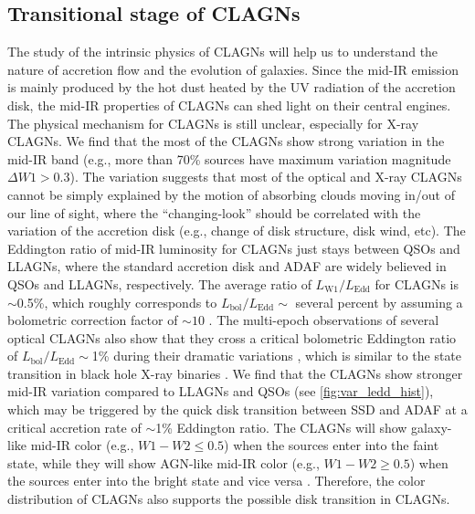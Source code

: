 \documentclass[linenumbers]{aastex631}
\begin{document}
\subsection{Transitional stage of CLAGNs}
The study of the intrinsic physics of CLAGNs will help us to understand the nature of accretion flow and the evolution of galaxies. Since the mid-IR emission is mainly produced by the hot dust heated by the UV radiation of the accretion disk, the mid-IR properties of CLAGNs can shed light on their central engines. The physical mechanism for CLAGNs is still unclear, especially for X-ray CLAGNs. We find that the most of the CLAGNs show strong variation in the mid-IR band (e.g., more than 70\% sources have maximum variation magnitude $\Delta W1>0.3$). The variation suggests that most of the optical and X-ray CLAGNs cannot be simply explained by the motion of absorbing clouds moving in/out of our line of sight, where the ``changing-look'' should be correlated with the variation of the accretion disk (e.g., change of disk structure, disk wind, etc). The Eddington ratio of mid-IR luminosity for CLAGNs just stays between QSOs and LLAGNs, where the standard accretion disk and ADAF are widely believed in QSOs and LLAGNs, respectively. The average ratio of $L_\mathrm{W1}/L_\mathrm{Edd}$ for CLAGNs is $\sim $0.5\%, which roughly corresponds to $L_\mathrm{bol}/L_\mathrm{Edd}\sim$ several percent by assuming a bolometric correction factor of $\sim 10$ \citep[e.g.,][]{2012MNRAS.426.2677R}. The multi-epoch observations of several {\color{red}optical} CLAGNs also show that they cross a critical bolometric Eddington ratio of $L_\mathrm{bol}/L_\mathrm{Edd}\sim$1\% during their dramatic variations \citep[e.g.,][]{2019ApJ...874....8M,2019ApJ...883...76R,2021MNRAS.508..144G,2021MNRAS.506.4188L,2021MNRAS.507..687J}, which is similar to the state transition in black hole X-ray binaries \citep[e.g.,][]{2008ApJ...682..212W}. We find that the CLAGNs show stronger mid-IR variation compared to LLAGNs and QSOs (see \autoref{fig:var_ledd_hist}), which may be triggered by the quick disk transition between SSD and ADAF at a critical accretion rate of $\sim$1\% Eddington ratio. The CLAGNs will show galaxy-like mid-IR color (e.g., $W1-W2\leq0.5$) when the sources enter into the faint state, while they will show AGN-like mid-IR color (e.g., $W1-W2\geq0.5$) when the sources enter into the bright state and vice versa \citep[e.g.,][]{2012ApJ...753...30S,2013AJ....145...55Y,2020ApJ...889...46S}. Therefore, the color distribution of CLAGNs also supports the possible disk transition in CLAGNs. 
\end{document}
